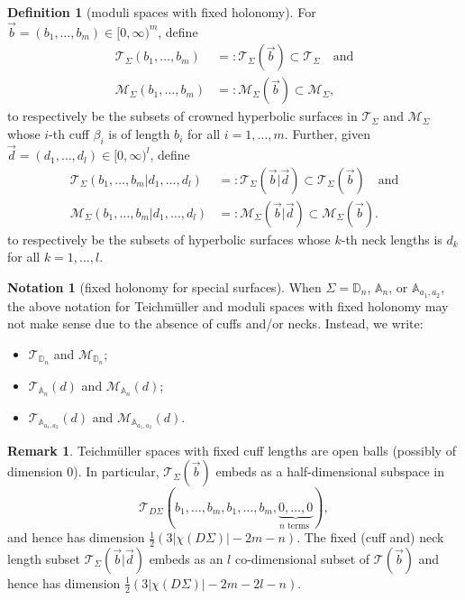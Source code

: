 \documentclass{amsart}
\theoremstyle{definition}
\newtheorem{definition}[proposition]{Definition}
\newtheorem{notation}[proposition]{Notation}
\newtheorem{remark}[proposition]{Remark}
\begin{document}
\begin{definition}[moduli spaces with fixed holonomy]
\label{def:fixed-holonomy}
For $\vec{b}=(b_1,\ldots,b_m)\in[0,\infty)^m$, define
\begin{align*}
\mathcal{T}_\Sigma(b_1,\ldots,b_m)
&=:\mathcal{T}_\Sigma(\vec{b})
\subset\mathcal{T}_\Sigma
\quad\text{and}\\
\mathcal{M}_\Sigma(b_1,\ldots,b_m)
&=:\mathcal{M}_\Sigma(\vec{b})
\subset\mathcal{M}_\Sigma,
\end{align*}
to respectively be the subsets of crowned hyperbolic surfaces in $\mathcal{T}_\Sigma$ and $\mathcal{M}_\Sigma$ whose $i$-th cuff $\beta_i$ is of length $b_i$ for all $i=1,\ldots,m$. Further, given $\vec{d}=(d_1,\ldots,d_l)\in[0,\infty)^l$, define
\begin{align*}
\mathcal{T}_\Sigma(b_1,\ldots,b_m|d_1,\ldots,d_l)
&=:\mathcal{T}_\Sigma(\vec{b}|\vec{d})
\subset\mathcal{T}_\Sigma(\vec{b})
\quad\text{and}\\
\mathcal{M}_\Sigma(b_1,\ldots,b_m|d_1,\ldots,d_l)
&=:\mathcal{M}_\Sigma(\vec{b}|\vec{d})
\subset\mathcal{M}_\Sigma(\vec{b}).
\end{align*}
to respectively be the subsets of hyperbolic surfaces whose $k$-th neck lengths is $d_k$ for all $k=1,\ldots,l$.
\end{definition}

\begin{notation}[fixed holonomy for special surfaces]
When $\Sigma=\mathbb{D}_n$, $\mathbb{A}_{n}$, or $\mathbb{A}_{a_1,a_2}$, the above notation for Teichm\"uller and moduli spaces with fixed holonomy may not make sense due to the absence of cuffs and/or necks. Instead, we write:
    \begin{itemize}
        \item  $\mathcal{T}_{\mathbb{D}_n}$ and $\mathcal{M}_{\mathbb{D}_n}$;
        \item $\mathcal{T}_{\mathbb{A}_{n}}(d)$ and $\mathcal{M}_{\mathbb{A}_{n}}(d)$;
        \item $\mathcal{T}_{\mathbb{A}_{a_1,a_2}}(d)$ and $\mathcal{M}_{\mathbb{A}_{a_1,a_2}}(d)$.
    \end{itemize}
\end{notation}


\begin{remark}
    Teichm\"uller spaces with fixed cuff lengths are open balls (possibly of dimension $0$). In particular, $\mathcal{T}_\Sigma(\vec{b})$ embeds as a half-dimensional subspace in 
    \[
    \mathcal{T}_{D\Sigma}(b_1,\ldots,b_m,b_1,\ldots,b_m,\underbrace{0,\ldots,0}_{n\text{ terms }}),
    \]
    and hence has dimension  $\frac{1}{2}(3|\chi(D\Sigma)|-2m-n)$. The fixed (cuff and) neck length subset $\mathcal{T}_\Sigma(\vec{b}|\vec{d})$ embeds as an $l$ co-dimensional subset of $\mathcal{T}(\vec{b})$ and hence has dimension $ \frac{1}{2}(3|\chi(D\Sigma)|-2m-2l-n)$.
\end{remark}
\end{document}
